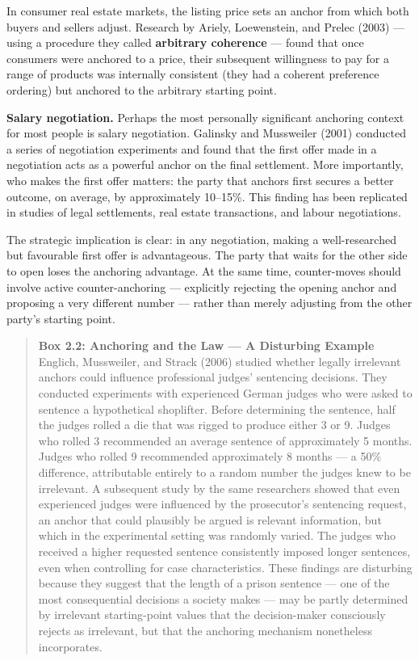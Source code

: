 \documentclass[12pt, letterpaper]{article}
\begin{document}
In consumer real estate markets, the listing price sets an anchor from which both buyers and sellers adjust. Research by Ariely, Loewenstein, and Prelec (2003) --- using a procedure they called \textbf{arbitrary coherence} --- found that once consumers were anchored to a price, their subsequent willingness to pay for a range of products was internally consistent (they had a coherent preference ordering) but anchored to the arbitrary starting point.

\textbf{Salary negotiation.} Perhaps the most personally significant anchoring context for most people is salary negotiation. Galinsky and Mussweiler (2001) conducted a series of negotiation experiments and found that the first offer made in a negotiation acts as a powerful anchor on the final settlement. More importantly, who makes the first offer matters: the party that anchors first secures a better outcome, on average, by approximately 10--15\%. This finding has been replicated in studies of legal settlements, real estate transactions, and labour negotiations.

The strategic implication is clear: in any negotiation, making a well-researched but favourable first offer is advantageous. The party that waits for the other side to open loses the anchoring advantage. At the same time, counter-moves should involve active counter-anchoring --- explicitly rejecting the opening anchor and proposing a very different number --- rather than merely adjusting from the other party's starting point.

\begin{quote}
\textbf{Box 2.2: Anchoring and the Law --- A Disturbing Example}
Englich, Mussweiler, and Strack (2006) studied whether legally irrelevant anchors could influence professional judges' sentencing decisions. They conducted experiments with experienced German judges who were asked to sentence a hypothetical shoplifter. Before determining the sentence, half the judges rolled a die that was rigged to produce either 3 or 9. Judges who rolled 3 recommended an average sentence of approximately 5 months. Judges who rolled 9 recommended approximately 8 months --- a 50\% difference, attributable entirely to a random number the judges knew to be irrelevant.
A subsequent study by the same researchers showed that even experienced judges were influenced by the prosecutor's sentencing request, an anchor that could plausibly be argued is relevant information, but which in the experimental setting was randomly varied. The judges who received a higher requested sentence consistently imposed longer sentences, even when controlling for case characteristics.
These findings are disturbing because they suggest that the length of a prison sentence --- one of the most consequential decisions a society makes --- may be partly determined by irrelevant starting-point values that the decision-maker consciously rejects as irrelevant, but that the anchoring mechanism nonetheless incorporates.
\end{quote}
\end{document}
